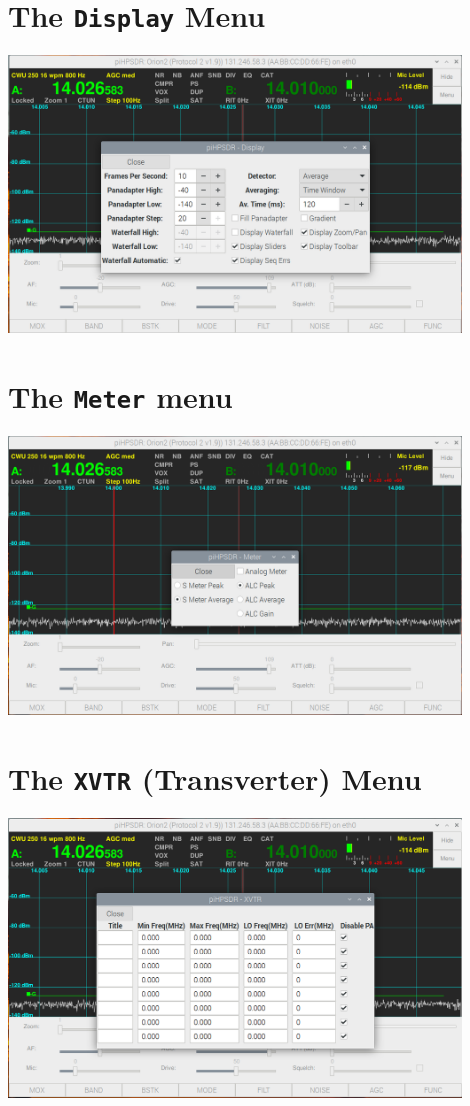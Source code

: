 \documentclass[12pt]{book}
\begin{document}
\section{The \texttt{Display} Menu}
\begin{center}
\includegraphics[width=12cm]{DisplayMenu.png}
\end{center}

\section{The \texttt{Meter} menu}
\begin{center}
\includegraphics[width=12cm]{MeterMenu.png}
\end{center}

\section{The \texttt{XVTR} (Transverter) Menu}
\begin{center}
\includegraphics[width=12cm]{XVTRMenu.png}
\end{center}
\end{document}
